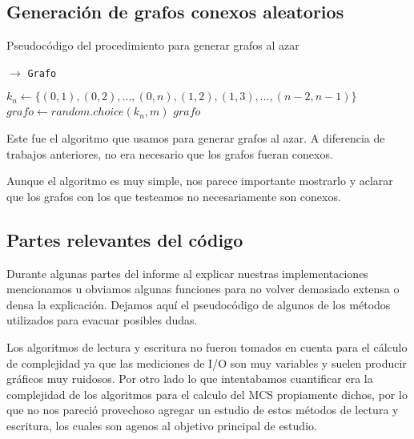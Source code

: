 
\subsection{Generación de grafos conexos aleatorios}
\label{subsec:grafos-aleatorios}

\begin{algorithm}[H]
  \begin{algorithmic}[1]
  \caption{Pseudocódigo del procedimiento para generar grafos al azar}
  \label{algo:ap-1}
    $\rightarrow$ \texttt{Grafo}

    	\State $k_n \gets \{(0,1), (0,2), ..., (0,n), (1,2), (1,3), ..., (n-2, n-1)\}$
      \State $grafo \gets random.choice(k_n, m)$
      \Return $grafo$
		\EndProcedure
	\end{algorithmic}
\end{algorithm}


Este fue el algoritmo que usamos para generar grafos al azar. A diferencia de trabajos anteriores, no era necesario que los grafos fueran conexos.

Aunque el algoritmo es muy simple, nos parece importante mostrarlo y aclarar que los grafos con los que testeamos no necesariamente son conexos.



\newpage
\subsection{Partes relevantes del código}
\lstset{language=C++, breaklines=true, basicstyle=\footnotesize}
\lstset{numbers=left, numberstyle=\tiny, stepnumber=1, numbersep=5pt, tabsize=2}

Durante algunas partes del informe al explicar nuestras implementaciones mencionamos u obviamos algunas funciones para no volver demasiado extensa o densa la explicación. Dejamos aquí el pseudocódigo de algunos de los métodos utilizados para evacuar posibles dudas.

Los algoritmos de lectura y escritura no fueron tomados en cuenta para el cálculo de complejidad ya que las mediciones de I/O son muy variables y suelen producir gráficos muy ruidosos. Por otro lado lo que intentabamos cuantificar era la complejidad de los algoritmos para el calculo del MCS propiamente dichos, por lo que no nos pareció provechoso agregar un estudio de estos métodos de lectura y escritura, los cuales son agenos al objetivo principal de estudio.


